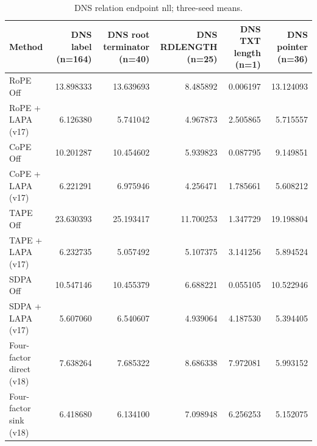 \begin{table}[t]
\centering
\scriptsize
\caption{DNS relation endpoint nll; three-seed means.}
\begin{tabular}{lrrrrr}
\toprule
Method & DNS label (n=164) & DNS root terminator (n=40) & DNS RDLENGTH (n=25) & DNS TXT length (n=1) & DNS pointer (n=36) \\
\midrule
RoPE Off & 13.898333 & 13.639693 & 8.485892 & 0.006197 & 13.124093 \\
RoPE + LAPA (v17) & 6.126380 & 5.741042 & 4.967873 & 2.505865 & 5.715557 \\
CoPE Off & 10.201287 & 10.454602 & 5.939823 & 0.087795 & 9.149851 \\
CoPE + LAPA (v17) & 6.221291 & 6.975946 & 4.256471 & 1.785661 & 5.608212 \\
TAPE Off & 23.630393 & 25.193417 & 11.700253 & 1.347729 & 19.198804 \\
TAPE + LAPA (v17) & 6.232735 & 5.057492 & 5.107375 & 3.141256 & 5.894524 \\
SDPA Off & 10.547146 & 10.455379 & 6.688221 & 0.055105 & 10.522946 \\
SDPA + LAPA (v17) & 5.607060 & 6.540607 & 4.939064 & 4.187530 & 5.394405 \\
Four-factor direct (v18) & 7.638264 & 7.685322 & 8.686338 & 7.972081 & 5.993152 \\
Four-factor sink (v18) & 6.418680 & 6.134100 & 7.098948 & 6.256253 & 5.152075 \\
\bottomrule
\end{tabular}
\end{table}
